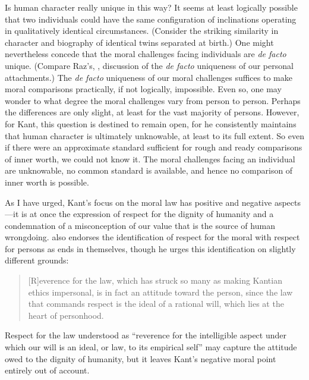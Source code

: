\documentclass[12pt]{article}
\begin{document}
Is human character really unique in this way? It seems at least logically possible that two individuals could have the same configuration of inclinations operating in qualitatively identical circumstances. (Consider the striking similarity in character and biography of identical twins separated at birth.) One might nevertheless concede that the moral challenges facing individuals are \emph{de facto} unique. (Compare Raz's, \citeyear[ch.\ 1]{Raz:2001ps}, discussion of the \emph{de facto} uniqueness of our personal attachments.) The \emph{de facto} uniqueness of our moral challenges suffices to make moral comparisons practically, if not logically, impossible. Even so, one may wonder to what degree the moral challenges vary from person to person. Perhaps the differences are only slight, at least for the vast majority of persons. However, for Kant, this question is destined to remain open, for he consistently maintains that human character is ultimately unknowable, at least to its full extent. So even if there were an approximate standard sufficient for rough and ready comparisons of inner worth, we could not know it. The moral challenges facing an individual are unknowable, no common standard is available, and hence no comparison of inner worth is possible.

As I have urged, Kant's focus on the moral law has positive and negative aspects---it is at once the expression of respect for the dignity of humanity and a condemnation of a misconception of our value that is the source of human wrongdoing. \citet{Velleman:2006nx} also endorses the identification of respect for the moral with respect for persons as ends in themselves, though he urges this identification on slightly different grounds:
\begin{quote}
	[R]everence for the law, which has struck so many as making Kantian ethics impersonal, is in fact an attitude toward the person, since the law that commands respect is the ideal of a rational will, which lies at the heart of personhood. \citep[81]{Velleman:2006nx}
\end{quote}
Respect for the law understood as ``reverence for the intelligible aspect under which our will is an ideal, or law, to its empirical self'' \citep[80]{Velleman:2006nx} may capture the attitude owed to the dignity of humanity, but it leaves Kant's negative moral point entirely out of account.
\end{document}
